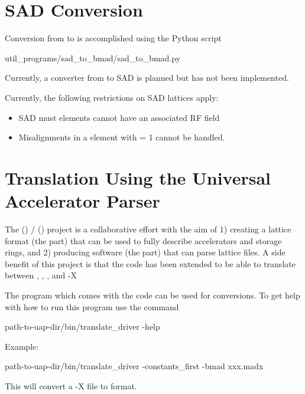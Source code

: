 \section{SAD Conversion}
\label{s:sad.convert}

Conversion from \cite{b:sad} to \bmad is accomplished using the Python script
\begin{example}
  util_programs/sad_to_bmad/sad_to_bmad.py
\end{example}
Currently, a converter from \bmad to SAD is planned but has not been implemented.

Currently, the following restrictions on SAD lattices apply:
  \begin{itemize}
  \item
SAD must elements cannot have an associated RF field
  \item
Misalignments in a  element with  = 1 cannot be handled.
  \end{itemize}

\section{Translation Using the Universal Accelerator Parser}
\label{s:aml}

The  () /  ()
project\cite{b:aml} is a collaborative effort with the aim of 1) creating a lattice format (the
 part) that can be used to fully describe accelerators and storage rings, and 2) producing
software (the  part) that can parse  lattice files. A side benefit of this project
is that the  code has been extended to be able to translate between , \bmad, ,
and \mad-X

The program  which comes with the  code can be used for conversions. To
get help with how to run this program use the command
\begin{example}
  path-to-uap-dir/bin/translate_driver -help
\end{example}
Example:
\begin{example}
  path-to-uap-dir/bin/translate_driver -constants_first -bmad xxx.madx
\end{example}
This will convert a \mad-X file  to \bmad format.
